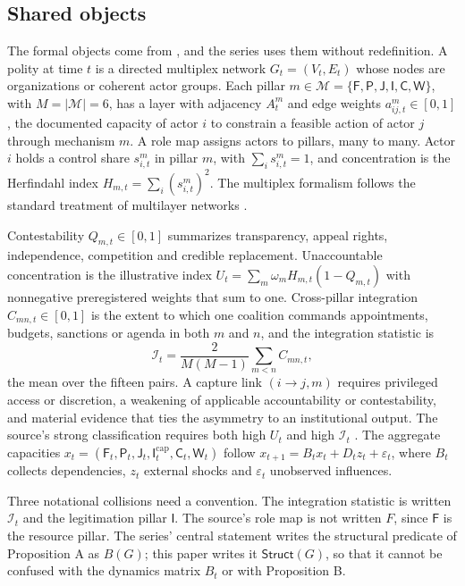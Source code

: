 \documentclass[11pt,letterpaper]{article}
\theoremstyle{definition}
\theoremstyle{remark}
\newcommand{\pF}{\mathsf{F}}
\newcommand{\pP}{\mathsf{P}}
\newcommand{\pJ}{\mathsf{J}}
\newcommand{\pI}{\mathsf{I}}
\newcommand{\pC}{\mathsf{C}}
\newcommand{\pW}{\mathsf{W}}
\newcommand{\Mset}{\mathcal{M}}
\newcommand{\Integ}{\mathcal{I}}
\newcommand{\Struct}{\mathsf{Struct}}
\begin{document}
\subsection{Shared objects}

The formal objects come from \citet{largo2026hbs}, and the series uses them without redefinition. A polity at time $t$ is a directed multiplex network $G_t=(V_t,E_t)$ whose nodes are organizations or coherent actor groups. Each pillar $m\in\Mset=\{\pF,\pP,\pJ,\pI,\pC,\pW\}$, with $M=|\Mset|=6$, has a layer with adjacency $A^m_t$ and edge weights $a^m_{ij,t}\in[0,1]$, the documented capacity of actor $i$ to constrain a feasible action of actor $j$ through mechanism $m$. A role map assigns actors to pillars, many to many. Actor $i$ holds a control share $s^m_{i,t}$ in pillar $m$, with $\sum_i s^m_{i,t}=1$, and concentration is the Herfindahl index $H_{m,t}=\sum_i(s^m_{i,t})^2$. The multiplex formalism follows the standard treatment of multilayer networks \citep{kivela2014}.

Contestability $Q_{m,t}\in[0,1]$ summarizes transparency, appeal rights, independence, competition and credible replacement. Unaccountable concentration is the illustrative index $U_t=\sum_m\omega_mH_{m,t}(1-Q_{m,t})$ with nonnegative preregistered weights that sum to one. Cross-pillar integration $C_{mn,t}\in[0,1]$ is the extent to which one coalition commands appointments, budgets, sanctions or agenda in both $m$ and $n$, and the integration statistic is
\[
\Integ_t=\frac{2}{M(M-1)}\sum_{m<n}C_{mn,t},
\]
the mean over the fifteen pairs. A capture link $(i\to j,m)$ requires privileged access or discretion, a weakening of applicable accountability or contestability, and material evidence that ties the asymmetry to an institutional output. The source's strong classification requires both high $U_t$ and high $\Integ_t$ \citep{largo2026hbs}. The aggregate capacities $x_t=(\pF_t,\pP_t,\pJ_t,\pI^{\mathrm{cap}}_t,\pC_t,\pW_t)$ follow $x_{t+1}=B_tx_t+D_tz_t+\varepsilon_t$, where $B_t$ collects dependencies, $z_t$ external shocks and $\varepsilon_t$ unobserved influences.

Three notational collisions need a convention. The integration statistic is written $\Integ_t$ and the legitimation pillar $\pI$. The source's role map is not written $F$, since $\pF$ is the resource pillar. The series' central statement writes the structural predicate of Proposition A as $B(G)$; this paper writes it $\Struct(G)$, so that it cannot be confused with the dynamics matrix $B_t$ or with Proposition B.
\end{document}
